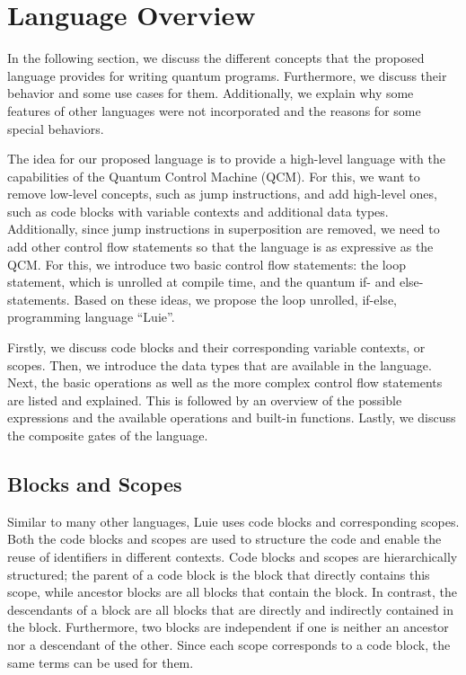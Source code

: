\section{Language Overview}
In the following section, we discuss the different concepts that the proposed language provides for writing quantum programs. Furthermore, we discuss their behavior and some use cases for them. Additionally, we explain why some features of other languages were not incorporated and the reasons for some special behaviors. 

The idea for our proposed language is to provide a high-level language with the capabilities of the Quantum Control Machine (QCM). For this, we want to remove low-level concepts, such as jump instructions, and add high-level ones, such as code blocks with variable contexts and additional data types. Additionally, since jump instructions in superposition are removed, we need to add other control flow statements so that the language is as expressive as the QCM. For this, we introduce two basic control flow statements: the loop statement, which is unrolled at compile time, and the quantum if- and else-statements. Based on these ideas, we propose the loop unrolled, if-else, programming language ``Luie''.

Firstly, we discuss code blocks and their corresponding variable contexts, or scopes. Then, we introduce the data types that are available in the language. Next, the basic operations as well as the more complex control flow statements are listed and explained. This is followed by an overview of the possible expressions and the available operations and built-in functions. Lastly, we discuss the composite gates of the language. 

\subsection{Blocks and Scopes}
\label{sec:concept_blocksAndScope}
Similar to many other languages, Luie uses code blocks and corresponding scopes. Both the code blocks and scopes are used to structure the code and enable the reuse of identifiers in different contexts. Code blocks and scopes are hierarchically structured; the parent of a code block is the block that directly contains this scope, while ancestor blocks are all blocks that contain the block.
In contrast, the descendants of a block are all blocks that are directly and indirectly contained in the block. Furthermore, two blocks are independent if one is neither an ancestor nor a descendant of the other. Since each scope corresponds to a code block, the same terms can be used for them.

